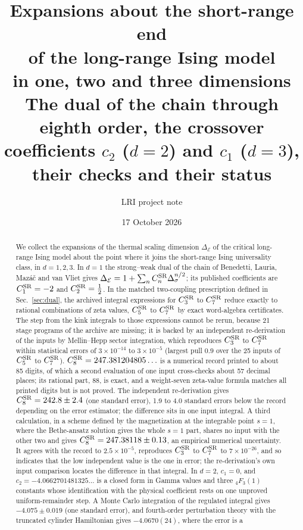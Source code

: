 \documentclass[11pt,a4paper]{article}
\title{\textbf{Expansions about the short-range end\\ of the long-range Ising model\\
in one, two and three dimensions}\\[3mm]
\large The dual of the chain through eighth order, the crossover coefficients $c_2$ ($d=2$) and $c_1$ ($d=3$),
their checks and their status}
\author{LRI project note}
\date{17 October 2026}
\numberwithin{equation}{section}
\newcommand{\De}{\Delta_{\mathcal E}}
\newcommand{\Ds}{\Delta_\sigma}
\newcommand{\CSR}{C^{\rm SR}}
\newcommand{\sci}[2]{#1\times10^{#2}}
\begin{document}
\maketitle

\begin{abstract}
\noindent
We collect the expansions of the thermal scaling dimension $\De$ of the critical long-range Ising model about the
point where it joins the short-range Ising universality class, in $d=1,2,3$. In $d=1$ the strong--weak dual of the
chain of Benedetti, Lauria, Maz\'a\v c and van Vliet gives $\De=1+\sum_n\CSR_n\Ds^{n/2}$; its published coefficients
are $\CSR_1=-2$ and $\CSR_2=\frac12$. In the matched two-coupling prescription defined in Sec.~\ref{sec:dual}, the
archived integral expressions for $\CSR_3$ to $\CSR_7$ reduce exactly to rational combinations of zeta values,
$\CSR_5$ to $\CSR_7$ by exact word-algebra certificates. The step from the kink integrals to those expressions cannot
be rerun, because 21 stage programs of the archive are missing; it is backed by an independent re-derivation of the
inputs by Mellin--Hepp sector integration, which reproduces $\CSR_3$ to $\CSR_7$ within statistical errors of
$\sci{3}{-14}$ to $\sci{3}{-5}$ (largest pull $0.9$ over the 25 inputs of $\CSR_5$ to $\CSR_7$).
$\CSR_8=247.381204805\ldots$ is a numerical record printed to about 85 digits, of which a second evaluation of one
input cross-checks about 57 decimal places; its rational part, 88, is exact, and a weight-seven zeta-value formula
matches all printed digits but is not proved. The independent re-derivation gives $\CSR_8=242.8\pm2.4$ (one
standard error), 1.9 to 4.0 standard errors below the record depending on the error estimator; the difference sits
in one input integral. A third calculation, in a scheme defined by the magnetization at the integrable point $s=1$,
where the Bethe-ansatz solution gives the whole $s=1$ part, shares no input with the other two and gives
$\CSR_8=247.38118\pm0.13$, an empirical numerical uncertainty. It agrees with the record to $\sci{2.5}{-5}$, reproduces
$\CSR_3$ to $\CSR_7$ to $\sci{7}{-26}$, and so indicates that the low independent value is the one in error; the
re-derivation's own input comparison locates the difference in that integral. In $d=2$, $c_1=0$, and $c_2=-4.0662701481325\ldots$ is a closed form in Gamma values and three
${}_4F_3(1)$ constants whose identification with the physical coefficient rests on one unproved uniform-remainder
step. A Monte Carlo integration of the regulated integral gives $-4.075\pm0.019$ (one standard error), and
fourth-order perturbation theory with the truncated cylinder Hamiltonian gives $-4.0670(24)$, where the error is a

\end{abstract}
\end{document}
